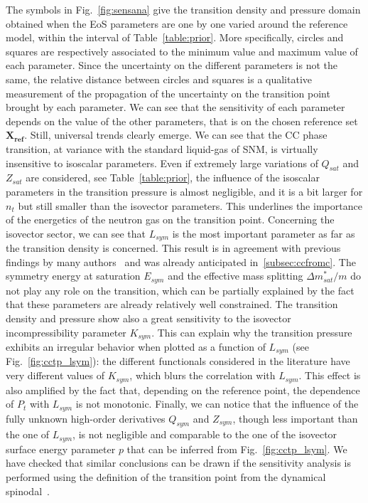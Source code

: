 The symbols in Fig.~\ref{fig:sensana} give the transition density and 
pressure domain obtained when the EoS parameters are one by one varied around 
the reference model, within the interval of Table~\ref{table:prior}. More
specifically, circles and squares are respectively associated to the minimum
value and maximum value of each parameter.
Since the uncertainty on the different parameters is not the same, the 
relative distance between circles and squares is a qualitative measurement of 
the propagation of the uncertainty on the transition point brought by each 
parameter. We can see that the sensitivity of each parameter depends on the 
value of the other parameters, that is on the chosen reference set 
$\bm{X_{ref}}$. Still, universal trends clearly emerge. We can see that the CC 
phase transition, at variance with the 
standard liquid-gas of SNM, is virtually insensitive to isoscalar parameters. 
Even if extremely large variations of $Q_{sat}$ and $Z_{sat}$ are considered, 
see Table~\ref{table:prior}, the influence of the isoscalar parameters in the 
transition pressure is almost negligible, and it is a bit larger for $n_t$ but 
still smaller than the isovector parameters. This underlines the importance of 
the energetics of the neutron gas on the transition point. Concerning the 
isovector sector, we can see that $L_{sym}$ is the most important 
parameter as far as the transition density is concerned. This result is in 
agreement with previous findings by many authors~\cite{Ducoin2011} and was
already anticipated in~\ref{subsec:ccfromc}.
The symmetry energy at saturation $E_{sym}$ and the effective mass splitting
$\Delta m_{sat}^*/m$ do not play any role on the transition, which can be 
partially explained by the fact that these parameters are already relatively 
well constrained. The transition density and pressure show also a great 
sensitivity to the isovector incompressibility parameter $K_{sym}$. 
This can explain why the transition pressure exhibits an irregular behavior 
when plotted as a function of $L_{sym}$ (see Fig.~\ref{fig:cctp_lsym}): the 
different functionals considered in the literature have very different values 
of $K_{sym}$, which blurs the correlation with $L_{sym}$. This effect is also 
amplified by the fact that, depending on the reference point, the dependence of 
$P_t$ with $L_{sym}$ is not monotonic. Finally, we can notice that the 
influence of the fully unknown high-order derivatives $Q_{sym}$ and $Z_{sym}$, 
though less important than the one of $L_{sym}$, is not negligible and 
comparable to the one of the isovector surface energy parameter $p$ that can be 
inferred from Fig.~\ref{fig:cctp_lsym}. We have checked that similar 
conclusions can be drawn if the sensitivity analysis is performed using the 
definition of the transition point from the dynamical 
spinodal~\cite{Antic2019}.

